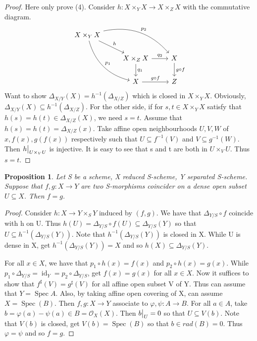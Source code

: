 \documentclass{ctexart}
\newtheorem{proposition}{Proposition}[section]
\newcommand{\identity}{\operatorname{id}}
\newcommand{\spec}{\operatorname{Spec}}
\begin{document}
\begin{proof}
    Here only prove (4).
    Consider $h: X \times_{Y} X \longrightarrow X \times_{Z} X$ with the commutative diagram.
    \begin{equation*}
        \begin{tikzcd}
            X \times_{Y} X \arrow[drr, "p_{2}", bend left] \arrow[dr, "h"] \arrow[ddr, "p_{1}", bend right] && \\
            & X \times_{Z} X \arrow[r, "q_{2}"] \arrow[d, "q_{1}"] & 
            X \arrow[d, "g \circ f"] \\
            & X \arrow[r, "g \circ f"] &
            Z
        \end{tikzcd}
    \end{equation*}
    Want to show $\Delta_{X/Y}(X) = h^{-1}(\Delta_{X/Z})$ which is closed in $X \times_{Y} X$.
    Obviously, $\Delta_{X/Y}(X) \subseteq h^{-1}(\Delta_{X/Z})$.
    For the other side, if for $s,t\in X \times_{Y} X$ satisfy that $h(s) = h(t)\in \Delta_{X/Z}(X)$, we need $s = t$.
    Assume that $h(s) = h(t) = \Delta_{X/Z}(x)$.
    Take affine open neighbourhoods $U, V, W$ of $x, f(x), g(f(x))$ respectively such that $U \subseteq f^{-1}(V)$ and $V \subseteq g^{-1}(W)$.
    Then $h\big{|}_{U \times_{V} U}$ is injective.
    It is easy to see that s and t are both in $U \times_{V} U$.
    Thus $s = t$.  
\end{proof}
\begin{proposition}
    Let S be a scheme, X reduced S-scheme, Y separated S-scheme.
    Suppose that $f,g: X \longrightarrow Y$ are two S-morphisms coincider on a dense open subset $U \subseteq X$.
    Then $f = g$.
    \label{Proposition 4.6}
\end{proposition}
\begin{proof}
    Consider $h: X \longrightarrow Y \times_{S} Y$ induced by $(f, g)$.
    We have that $\Delta_{Y/S} \circ f$ coincide with h on U.
    Thus $h(U) = \Delta_{Y/S} \circ f(U) \subseteq \Delta_{Y/S}(Y)$ so that $U \subseteq h^{-1}(\Delta_{Y/S}(Y))$.
    Note that $h^{-1}(\Delta_{Y/S}(Y))$ is closed in X.
    While U is dense in X, get $h^{-1}(\Delta_{Y/S}(Y)) = X$ and so $h(X) \subseteq \Delta_{Y/S}(Y)$.
    \par
    For all $x\in X$, we have that $p_{1} \circ h(x) = f(x)$ and $p_{2} \circ h(x) = g(x)$.
    While $p_{1} \circ \Delta_{Y/S} = \identity_{Y} = p_{2} \circ \Delta_{Y/S}$, get $f(x) = g(x)$ for all $x\in X$.
    Now it suffices to show that $f^{\sharp}(V) = g^{\sharp}(V)$ for all affine open subset V of Y.
    Thus can assume that $Y = \spec A$.
    Also, by taking affine open covering of X, can assume $X = \spec(B)$.
    Then $f,g: X \longrightarrow Y$ associate to $\varphi, \psi: A \longrightarrow B$.
    For all $a\in A$, take $b = \varphi(a) - \psi(a)\in B = \mathcal{O}_{X}(X)$.
    Then $b\big{|}_{U} = 0$ so that $U \subseteq V(b)$.
    Note that $V(b)$ is closed, get $V(b) = \spec(B)$ so that $b\in rad(B) = 0$.
    Thus $\varphi = \psi$ and so $f = g$.
\end{proof}
\end{document}
